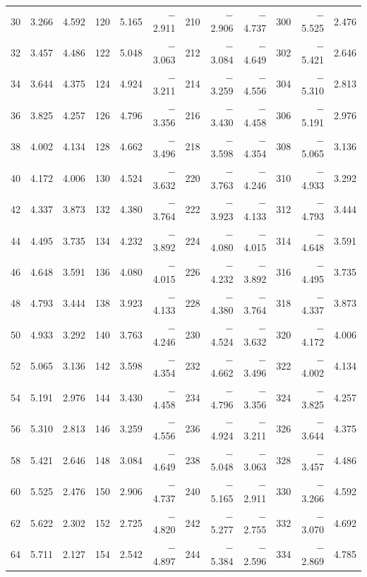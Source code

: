 \begin{table}[!h]
{\begin{tabular}{rrr|rrr|rrr|rrr}
 30 &   3.266 &  4.592 & 120 &   5.165 & $-$2.911 & 210 &  $-$2.906 & $-$4.737 & 300 &  $-$5.525 &  2.476\\
 32 &   3.457 &  4.486 & 122 &   5.048 & $-$3.063 & 212 &  $-$3.084 & $-$4.649 & 302 &  $-$5.421 &  2.646\\
 34 &   3.644 &  4.375 & 124 &   4.924 & $-$3.211 & 214 &  $-$3.259 & $-$4.556 & 304 &  $-$5.310 &  2.813\\
 36 &   3.825 &  4.257 & 126 &   4.796 & $-$3.356 & 216 &  $-$3.430 & $-$4.458 & 306 &  $-$5.191 &  2.976\\
 38 &   4.002 &  4.134 & 128 &   4.662 & $-$3.496 & 218 &  $-$3.598 & $-$4.354 & 308 &  $-$5.065 &  3.136\\
 40 &   4.172 &  4.006 & 130 &   4.524 & $-$3.632 & 220 &  $-$3.763 & $-$4.246 & 310 &  $-$4.933 &  3.292\\
 42 &   4.337 &  3.873 & 132 &   4.380 & $-$3.764 & 222 &  $-$3.923 & $-$4.133 & 312 &  $-$4.793 &  3.444\\
 44 &   4.495 &  3.735 & 134 &   4.232 & $-$3.892 & 224 &  $-$4.080 & $-$4.015 & 314 &  $-$4.648 &  3.591\\
 46 &   4.648 &  3.591 & 136 &   4.080 & $-$4.015 & 226 &  $-$4.232 & $-$3.892 & 316 &  $-$4.495 &  3.735\\
 48 &   4.793 &  3.444 & 138 &   3.923 & $-$4.133 & 228 &  $-$4.380 & $-$3.764 & 318 &  $-$4.337 &  3.873\\
 50 &   4.933 &  3.292 & 140 &   3.763 & $-$4.246 & 230 &  $-$4.524 & $-$3.632 & 320 &  $-$4.172 &  4.006\\
 52 &   5.065 &  3.136 & 142 &   3.598 & $-$4.354 & 232 &  $-$4.662 & $-$3.496 & 322 &  $-$4.002 &  4.134\\
 54 &   5.191 &  2.976 & 144 &   3.430 & $-$4.458 & 234 &  $-$4.796 & $-$3.356 & 324 &  $-$3.825 &  4.257\\
 56 &   5.310 &  2.813 & 146 &   3.259 & $-$4.556 & 236 &  $-$4.924 & $-$3.211 & 326 &  $-$3.644 &  4.375\\
 58 &   5.421 &  2.646 & 148 &   3.084 & $-$4.649 & 238 &  $-$5.048 & $-$3.063 & 328 &  $-$3.457 &  4.486\\
 60 &   5.525 &  2.476 & 150 &   2.906 & $-$4.737 & 240 &  $-$5.165 & $-$2.911 & 330 &  $-$3.266 &  4.592\\
 62 &   5.622 &  2.302 & 152 &   2.725 & $-$4.820 & 242 &  $-$5.277 & $-$2.755 & 332 &  $-$3.070 &  4.692\\
 64 &   5.711 &  2.127 & 154 &   2.542 & $-$4.897 & 244 &  $-$5.384 & $-$2.596 & 334 &  $-$2.869 &  4.785\\

\end{tabular}}
\end{table}
